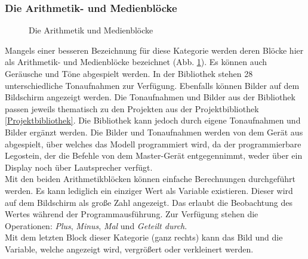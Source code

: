 \subsubsection{Die Arithmetik- und Medienblöcke}
\begin{figure}[htbp!]
	\centering
	\caption[Die Arithmetik und Medienblöcke]{Die Arithmetik und Medienblöcke} %
	\label{img:ArithmetikUndMedienblöcke}
\end{figure}
Mangels einer besseren Bezeichnung für diese Kategorie werden deren Blöcke hier als Arithmetik- und Medienblöcke bezeichnet (Abb. \ref{img:ArithmetikUndMedienblöcke}). Es können auch Geräusche und Töne abgespielt werden. In der Bibliothek stehen 28 unterschiedliche Tonaufnahmen zur Verfügung. Ebenfalls können Bilder auf dem Bildschirm angezeigt werden. Die Tonaufnahmen und Bilder aus der Bibliothek passen jeweils thematisch zu den Projekten aus der Projektbibliothek \ref{Projektbibliothek}. Die Bibliothek kann jedoch durch eigene Tonaufnahmen und Bilder ergänzt werden. Die Bilder und Tonaufnahmen werden von dem Gerät aus abgespielt, über welches das Modell programmiert wird, da der programmierbare Legostein, der die Befehle von dem Master-Gerät entgegennimmt, weder über ein Display noch über Lautsprecher verfügt.\\
Mit den beiden Arithmetikblöcken können einfache Berechnungen durchgeführt werden. Es kann lediglich ein einziger Wert als Variable existieren. Dieser wird auf dem Bildschirm als große Zahl angezeigt. Das erlaubt die Beobachtung des Wertes während der Programmausführung. Zur Verfügung stehen die Operationen: \textit{Plus}, \textit{Minus}, \textit{Mal} und \textit{Geteilt durch}.\\
Mit dem letzten Block dieser Kategorie (ganz rechts) kann das Bild und die Variable, welche angezeigt wird, vergrößert oder verkleinert werden.

